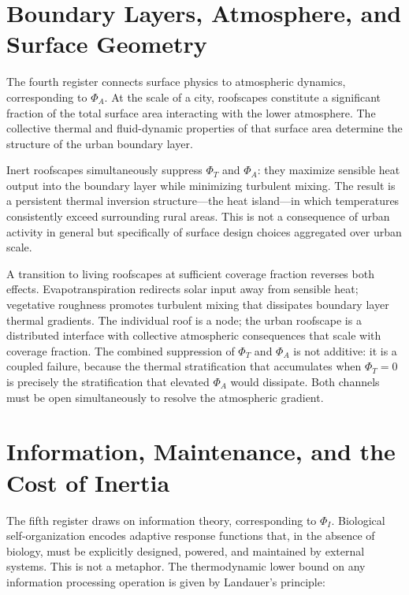 \documentclass[12pt, a4paper]{article}
\theoremstyle{plain}
\theoremstyle{remark}
\begin{document}
\section{Boundary Layers, Atmosphere, and Surface Geometry}

The fourth register connects surface physics to atmospheric dynamics, corresponding to $\Phi_A$. At the scale of a city, roofscapes constitute a significant fraction of the total surface area interacting with the lower atmosphere. The collective thermal and fluid-dynamic properties of that surface area determine the structure of the urban boundary layer.

Inert roofscapes simultaneously suppress $\Phi_T$ and $\Phi_A$: they maximize sensible heat output into the boundary layer while minimizing turbulent mixing. The result is a persistent thermal inversion structure---the heat island---in which temperatures consistently exceed surrounding rural areas. This is not a consequence of urban activity in general but specifically of surface design choices aggregated over urban scale.

A transition to living roofscapes at sufficient coverage fraction reverses both effects. Evapotranspiration redirects solar input away from sensible heat; vegetative roughness promotes turbulent mixing that dissipates boundary layer thermal gradients. The individual roof is a node; the urban roofscape is a distributed interface with collective atmospheric consequences that scale with coverage fraction. The combined suppression of $\Phi_T$ and $\Phi_A$ is not additive: it is a coupled failure, because the thermal stratification that accumulates when $\Phi_T = 0$ is precisely the stratification that elevated $\Phi_A$ would dissipate. Both channels must be open simultaneously to resolve the atmospheric gradient.

\section{Information, Maintenance, and the Cost of Inertia}

The fifth register draws on information theory, corresponding to $\Phi_I$. Biological self-organization encodes adaptive response functions that, in the absence of biology, must be explicitly designed, powered, and maintained by external systems. This is not a metaphor. The thermodynamic lower bound on any information processing operation is given by Landauer's principle:
\end{document}

